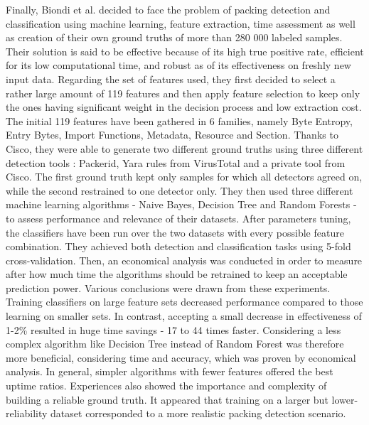Finally, Biondi et al. \cite{biondi_effective_2019} decided to face the problem of packing detection and classification using machine learning, feature extraction, time assessment as well as creation of their own ground truths of more than 280 000 labeled samples. Their solution is said to be effective because of its high true positive rate, efficient for its low computational time, and robust as of its effectiveness on freshly new input data. Regarding the set of features used, they first decided to select a rather large amount of 119 features and then apply feature selection to keep only the ones having significant weight in the decision process and low extraction cost. The initial 119 features have been gathered in 6 families, namely Byte Entropy, Entry Bytes, Import Functions, Metadata, Resource and Section. Thanks to Cisco, they were able to generate two different ground truths using three different detection tools : Packerid, Yara rules from VirusTotal and a private tool from Cisco. The first ground truth kept only samples for which all detectors agreed on, while the second restrained to one detector only. They then used three different machine learning algorithms - Naive Bayes, Decision Tree and Random Forests - to assess performance and relevance of their datasets. After parameters tuning, the classifiers have been run over the two datasets with every possible feature combination. They achieved both detection and classification tasks using 5-fold cross-validation. Then, an economical analysis was conducted in order to measure after how much time the algorithms should be retrained to keep an acceptable prediction power. Various conclusions were drawn from these experiments. Training classifiers on large feature sets decreased performance compared to those learning on smaller sets. In contrast, accepting a small decrease in effectiveness of 1-2\% resulted in huge time savings - 17 to 44 times faster. Considering a less complex algorithm like Decision Tree instead of Random Forest was therefore more beneficial, considering time and accuracy, which was proven by economical analysis. In general, simpler algorithms with fewer features offered the best uptime ratios. Experiences also showed the importance and complexity of building a reliable ground truth. It appeared that training on a larger but lower-reliability dataset corresponded to a more realistic packing detection scenario.
